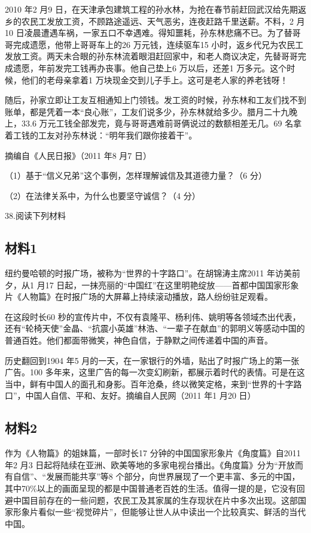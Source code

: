 \documentclass[UTF8,11pt]{ctexart}
\begin{document}
2010 年2 月9 日，在天津承包建筑工程的孙水林，为抢在春节前赶回武汉给先期返乡的农民工发放工资，不顾路途遥远、天气恶劣，连夜赶路千里送薪。不料，2 月10 日凌晨遭遇车祸，一家五口不幸遇难。得知噩耗，孙东林悲痛不已。为了替哥哥完成遗愿，他带上哥哥车上的26 万元钱，连续驱车15 小时，返乡代兄为农民工发放工资。两天未合眼的孙东林流着眼泪赶回家中，和老人商议决定，先替哥哥完成遗愿，年前发完工钱再办丧事。他自己垫上6 万以后，还差1 万多元。这个时候，他们的老母亲拿着1 万块现金交到儿子手上。这可是老人家的养老钱呀！

随后，孙家立即让工友互相通知上门领钱。发工资的时候，孙东林和工友们找不到账单，都是凭着一本“良心账”，工友们说多少，孙东林就给多少。腊月二十九晚上，33.6 万元工钱全部发完，竟与哥哥遇难前哥俩说过的数额相差无几。69 名拿着工钱的工友对孙东林说：“明年我们跟你接着干”。

摘编自《人民日报》（2011 年8 月7 日）

（1）基于“信义兄弟”这个事例，怎样理解诚信及其道德力量？（6 分）


（2）在法律关系中，为什么也要坚守诚信？（4 分）


38.阅读下列材料


\subsection*{材料1}

纽约曼哈顿的时报广场，被称为“世界的十字路口”。在胡锦涛主席2011 年访美前夕，从1 月17 日起，一抹亮丽的“中国红”在这里明艳绽放——首都中国国家形象片《人物篇》在时报广场的大屏幕上持续滚动播放，路人纷纷驻足观看。

在这段时长60 秒的宣传片中，不仅有袁隆平、杨利伟、姚明等各领域杰出代表，还有“轮椅天使”金晶、“抗震小英雄”林浩、“一辈子在献血”的郭明义等感动中国的普通百姓。他们都面带微笑，神色自信，于静默之间传递着中国的声音。

历史翻回到1904 年5 月的一天，在一家银行的外墙，贴出了时报广场上的第一张广告。100 多年来，这里广告的每一次变幻刷新，都展示着时代的表情。可是在这当中，鲜有中国人的面孔和身影。百年沧桑，终以微笑定格，来到“世界的十字路口”，中国人自信、平和、友好。摘编自人民网（2011 年1 月20 日）

\subsection*{材料2}

作为《人物篇》的姐妹篇，一部时长17 分钟的中国国家形象片《角度篇》自2011 年2 月3 日起将陆续在亚洲、欧美等地的多家电视台播出。《角度篇》分为“开放而有自信”、“发展而能共享”等8 个部分，向世界展现了一个更丰富、多元的中国，其中70\%以上的画面呈现的都是中国普通老百姓的生活。值得一提的是，它没有回避中国目前存在的一些问题，农民工及其家属的生存现状在片中多次出现。这部国家形象片看似一些“视觉碎片”，但能够让世人从中读出一个比较真实、鲜活的当代中国。
\end{document}
